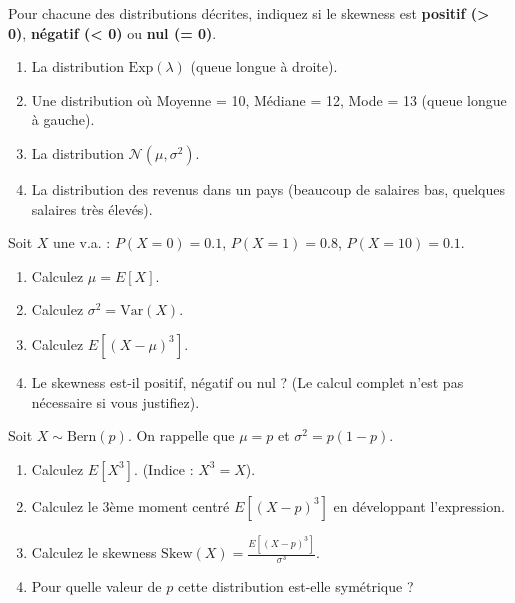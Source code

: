 \begin{exercicebox}
Pour chacune des distributions décrites, indiquez si le skewness est \textbf{positif (> 0)}, \textbf{négatif (< 0)} ou \textbf{nul (= 0)}.
\begin{enumerate}
    \item La distribution $\text{Exp}(\lambda)$ (queue longue à droite).
    \item Une distribution où Moyenne = 10, Médiane = 12, Mode = 13 (queue longue à gauche).
    \item La distribution $\mathcal{N}(\mu, \sigma^2)$.
    \item La distribution des revenus dans un pays (beaucoup de salaires bas, quelques salaires très élevés).
\end{enumerate}
\end{exercicebox}

\begin{exercicebox}
Soit $X$ une v.a. : $P(X=0)=0.1$, $P(X=1)=0.8$, $P(X=10)=0.1$.
\begin{enumerate}
    \item Calculez $\mu = E[X]$.
    \item Calculez $\sigma^2 = \text{Var}(X)$.
    \item Calculez $E[(X-\mu)^3]$.
    \item Le skewness est-il positif, négatif ou nul ? (Le calcul complet n'est pas nécessaire si vous justifiez).
\end{enumerate}
\end{exercicebox}

\begin{exercicebox}
Soit $X \sim \text{Bern}(p)$. On rappelle que $\mu = p$ et $\sigma^2 = p(1-p)$.
\begin{enumerate}
    \item Calculez $E[X^3]$. (Indice : $X^3 = X$).
    \item Calculez le 3ème moment centré $E[(X-p)^3]$ en développant l'expression.
    \item Calculez le skewness $\text{Skew}(X) = \frac{E[(X-p)^3]}{\sigma^3}$.
    \item Pour quelle valeur de $p$ cette distribution est-elle symétrique ?
\end{enumerate}
\end{exercicebox}


